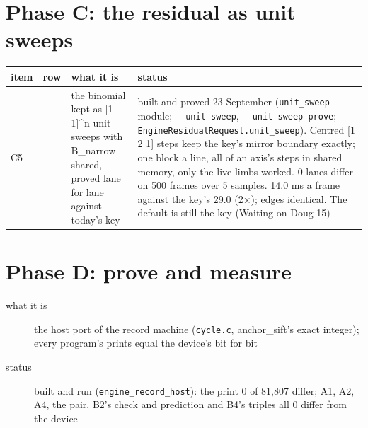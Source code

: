 \section{\texorpdfstring{Phase C: the residual as unit sweeps}{Phase C: the residual as unit sweeps}}

{\footnotesize
\setlength{\tabcolsep}{6pt}
\begin{longtable}{>{\RaggedRight\arraybackslash}p{}>{\RaggedRight\arraybackslash}p{}>{\RaggedRight\arraybackslash}p{}>{\RaggedRight\arraybackslash}p{}}
\toprule
item & row & what it is & status \\
\midrule
\endhead
C5 & 3 & the binomial kept as [1 1]\textasciicircum{}n unit sweeps with B\_\allowbreak{}narrow shared, proved lane for lane against today's key & built and proved 23 September (\texttt{unit\_\allowbreak{}sweep} module; \texttt{-\allowbreak{}-\allowbreak{}unit-\allowbreak{}sweep}, \texttt{-\allowbreak{}-\allowbreak{}unit-\allowbreak{}sweep-\allowbreak{}prove}; \texttt{Engine\allowbreak{}Residual\allowbreak{}Request.\allowbreak{}unit\_\allowbreak{}sweep}). Centred [1 2 1] steps keep the key's mirror boundary exactly; one block a line, all of an axis's steps in shared memory, only the live limbs worked. 0 lanes differ on 500 frames over 5 samples. 14.0 ms a frame against the key's 29.0 (2×); edges identical. The default is still the key (Waiting on Doug 15) \\
\bottomrule
\end{longtable}
}

\section{\texorpdfstring{Phase D: prove and measure}{Phase D: prove and measure}}

\begin{description}
\item[{what it is}] the host port of the record machine (\texttt{cycle.\allowbreak{}c}, anchor\_\allowbreak{}sift's exact integer); every program's prints equal the device's bit for bit
\item[{status}] built and run (\texttt{engine\_\allowbreak{}record\_\allowbreak{}host}): the print 0 of 81,807 differ; A1, A2, A4, the pair, B2's check and prediction and B4's triples all 0 differ from the device
\end{description}

